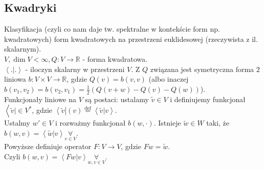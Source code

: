 \documentclass[../main.tex]{subfiles}
\begin{document}
    \subsection{Kwadryki}
    Klasyfikacja (czyli co nam daje tw. spektralne w kontekście form np. kwadratowych) form kwadratowych na przestrzeni euklidesowej (rzeczywista z il. skalarnym).\\
    $V, \dim V < \infty, Q:V\to \mathbb{R}$ - forma kwadratowa.\\
    $\left<.|. \right>$ - iloczyn skalarny w przestrzeni $V$. Z $Q$ związana jest symetryczna forma $2$ liniowa $b: V\times V\to \mathbb{R}$, gdzie $Q(v) = b(v,v)$ (albo inaczej  $b(v_1,v_2) = b(v_2,v_1) = \frac{1}{2}\left(Q(v+w) - Q(v) - Q(w)\right)$).\\
    Funkcjonały liniowe na $V$ są postaci: ustalamy $\tilde v\in V$ i definiujemy funkcjonał $\left<\tilde v|\in V^* \right.$, gdzie $\left<\tilde v\right|(v) \overset{\text{def}}{=} \left<\tilde v|v \right> $.\\
    Ustalmy $w'\in V$ i rozważmy funkcjonał $b(w,\cdot )$. Istnieje $\tilde w\in W$ taki, że $b(w,v) = \left<\tilde w|v \right>\underset{v\in V}{\forall} $.\\
    Powyższe definiuje operator $F: V\to V$, gdzie $F w = \tilde w$.\\
    Czyli $b(w,v) = \left<Fw|v \right> \underset{w,v\in V}{\forall} $.
\end{document}
